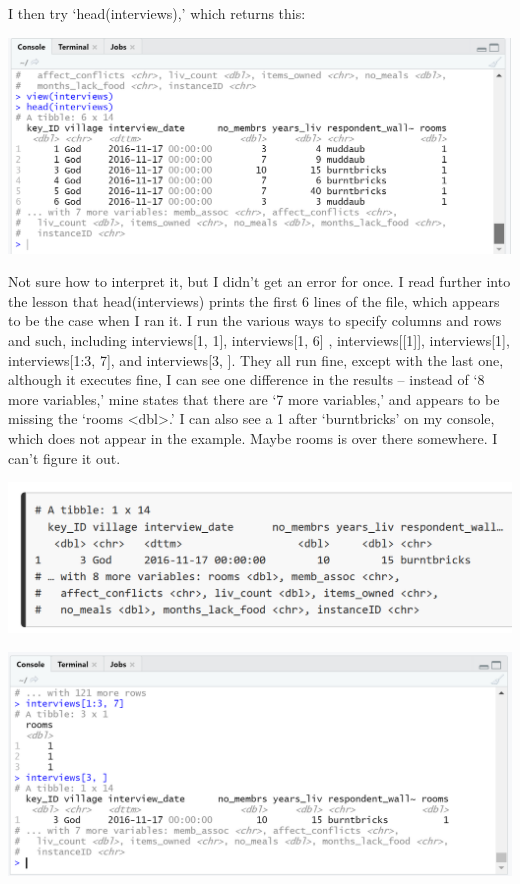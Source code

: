 \documentclass{article}
\begin{document}
I then try `head(interviews),' which returns this:

\includegraphics[width=1.0\textwidth]{rstudio_18.PNG}

Not sure how to interpret it, but I didn't get an error for once. I read further into the lesson that head(interviews) prints the first 6 lines of the file, which appears to be the case when I ran it. I run the various ways to specify columns and rows and such, including interviews[1, 1], interviews[1, 6] , interviews[[1]], interviews[1], interviews[1:3, 7], and interviews[3, ]. They all run fine, except with the last one, although it executes fine, I can see one difference in the results – instead of `8 more variables,' mine states that there are `7 more variables,' and appears to be missing the `rooms <dbl>.' I can also see a 1 after `burntbricks' on my console, which does not appear in the example. Maybe rooms is over there somewhere. I can't figure it out.

\includegraphics[width=1.0\textwidth]{rstudio_19.PNG}

\includegraphics[width=1.0\textwidth]{rstudio_20.PNG}
\end{document}
